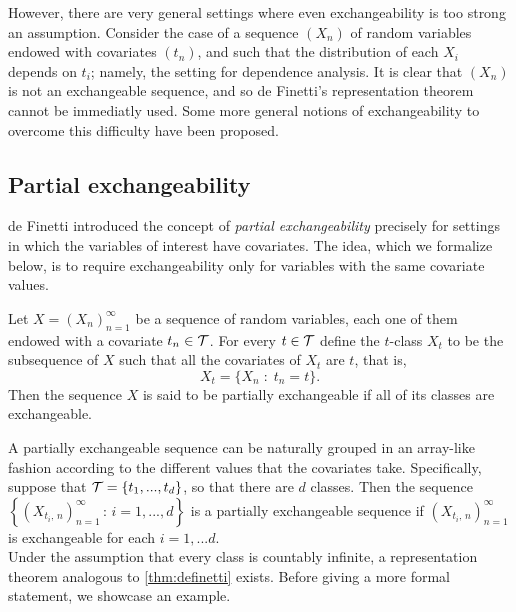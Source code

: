 However, there are very general settings where even exchangeability is too strong an assumption. Consider the case of a sequence $(X_n)$ of random variables endowed with covariates $(t_n)$, and such that the distribution of each $X_i$ depends on $t_i$; namely, the setting for dependence analysis. It is clear that $(X_n)$ is not an exchangeable sequence, and so de Finetti's representation theorem cannot be immediatly used. Some more general notions of exchangeability to overcome this difficulty have been proposed.


\subsection{Partial exchangeability}


de Finetti \cite{deFinetti:1938:partial_exch} introduced the concept of \textit{partial exchangeability} precisely for settings in which the variables of interest have covariates. The idea, which we formalize below, is to require exchangeability only for variables with the same covariate values.

\begin{definition} \label{def:partial_exchangeability}
	Let $X = (X_n)_{n=1}^{\infty}$ be a sequence of random variables, each one of them endowed with a covariate $t_n \in \mathcal{T}$. For every $t \in \mathcal{T}$ define the $t$-class $X_t$ to be the subsequence of $X$ such that all the covariates of $X_t$ are $t$, that is,
	\begin{equation*}
		X_t = \{ X_n \; : \; t_n = t \}.
	\end{equation*}
	Then the sequence $X$ is said to be partially exchangeable if all of its classes are exchangeable.
\end{definition}

A partially exchangeable sequence can be naturally grouped in an array-like fashion according to the different values that the covariates take. Specifically, suppose that $\mathcal{T} = \{t_1, ..., t_d \}$, so that there are $d$ classes. Then the sequence $\left\{ (X_{t_i, \, n})_{n=1}^{\infty} \, : \, i=1, ..., d \right\}$ is a partially exchangeable sequence if $(X_{t_i, \, n})_{n=1}^{\infty}$ is exchangeable for each $i=1, ...d$. \\

Under the assumption that every class is countably infinite, a representation theorem analogous to \ref{thm:definetti} exists. Before giving a more formal statement, we showcase an example.


